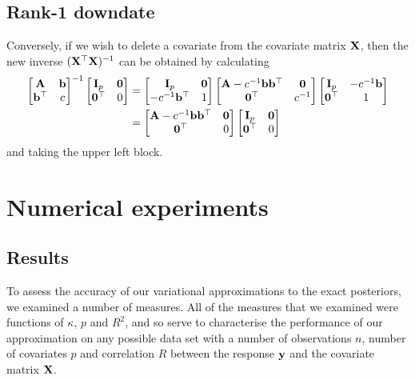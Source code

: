 \documentclass{amsart}[12pt]
\begin{document}
\subsection{Rank-1 downdate}
Conversely, if we wish to delete a covariate from the covariate matrix ${\bf X}$, then the new inverse
$({\bf X}^\top {\bf X})^{-1}$ can be obtained by calculating
\begin{align*}
	\begin{bmatrix}
		{\bf A} & {\bf b} \\
		{\bf b}^\top & c
	\end{bmatrix}^{-1}
	\begin{bmatrix}
		{\bf I}_p & {\bf 0} \\
		{\bf 0}^\top & 0
	\end{bmatrix}
	&= 
	\begin{bmatrix}
		{\bf I}_p & {\bf 0} \\
		-c^{-1} {\bf b}^\top & 1
	\end{bmatrix}
	\begin{bmatrix}
		{\bf A} - c^{-1} {\bf b} {\bf b}^\top & {\bf 0} \\
		{\bf 0}^\top & c^{-1}
	\end{bmatrix}
	\begin{bmatrix}
		{\bf I}_p & -c^{-1} {\bf b} \\
		{\bf 0}^\top & 1
	\end{bmatrix}
	\\
	&=
	\begin{bmatrix}
		{\bf A} - c^{-1} {\bf b} {\bf b}^\top & {\bf 0} \\
		{\bf 0}^\top & 0
	\end{bmatrix}
	\begin{bmatrix}
		{\bf I}_p & {\bf 0} \\
		{\bf 0}^\top & 0
	\end{bmatrix}
\end{align*}
and taking the upper left block.

\section{Numerical experiments}
\label{sec:num_exp}

\subsection{Results}

To assess the accuracy of our variational approximations to the exact posteriors, we examined a number of
measures. All of the measures that we examined were functions of $\kappa$, $p$ and $R^2$, and so serve to
characterise the performance of our approximation on any possible data set with a number of observations
$n$, number of covariates $p$ and correlation $R$ between the response ${\bf y}$ and the covariate matrix ${\bf X}$.
\end{document}
